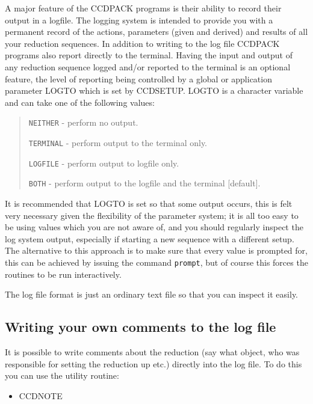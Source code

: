 \documentclass[twoside,11pt]{article}
\newcommand{\htmlref}[2]{#1}
\renewcommand{\_}{\texttt{\symbol{95}}}
\newenvironment{myquote}{\begin{quote}\begin{small}}{\end{small}\end{quote}}
\newcommand{\text}[1]{{\small \tt #1}}
\newcommand{\xroutine}[1]{\htmlref{{\sc #1}}{#1}}
\begin{document}
A major feature of the CCDPACK programs is their ability to record
their output in a logfile. The logging
system is intended to provide you with a permanent record of the
actions, parameters (given and derived) and results of all your
reduction sequences. In addition to writing to the log file CCDPACK
programs also report directly to the terminal.  Having the input and output of
any reduction sequence logged and/or reported to the terminal is an
optional feature, the level of reporting being controlled by a global
or application parameter LOGTO which is set by
\xroutine{CCDSETUP}. LOGTO is a character variable and can take
one of the following values:
\begin{myquote}
\begin{description}
\item \text{NEITHER} - perform no output.
\item \text{TERMINAL} - perform output to the terminal only.
\item \text{LOGFILE} - perform output to logfile only.
\item \text{BOTH} - perform output to the logfile and the terminal [default].
\end{description}
\end{myquote}
It is recommended that LOGTO is set so that some output
occurs, this is felt very necessary given the flexibility of the
parameter system; it is all too easy to be using values which you are
not aware of, and you should regularly inspect the log system output,
especially if starting a new sequence with a different setup. The
alternative to this approach is to make sure that every value is
prompted for, this can be achieved by issuing the command
\text{prompt}, but of course this forces the routines to be run
interactively.

The log file format is just an ordinary text file so that you can inspect
it easily.

\subsection{Writing your own comments to the log file}

It is possible to write comments about the reduction (say what object,
who was responsible for setting the reduction up etc.) directly into the
log file. To do this you can use the utility routine:
\begin{itemize}
\item \xroutine{CCDNOTE}
\end{itemize}
\end{document}
